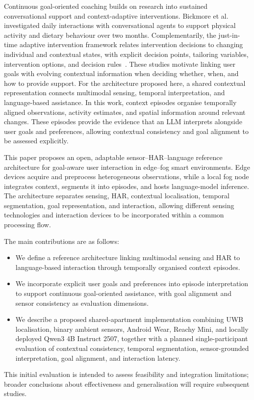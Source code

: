 \documentclass[10pt,twocolumn]{article}
\begin{document}
Continuous goal-oriented coaching builds on research into sustained conversational support and context-adaptive interventions. Bickmore et al.~\cite{bickmore2013interventions} investigated daily interactions with conversational agents to support physical activity and dietary behaviour over two months. Complementarily, the just-in-time adaptive intervention framework relates intervention decisions to changing individual and contextual states, with explicit decision points, tailoring variables, intervention options, and decision rules~\cite{nahumshani2018jitai}. These studies motivate linking user goals with evolving contextual information when deciding whether, when, and how to provide support. For the architecture proposed here, a shared contextual representation connects multimodal sensing, temporal interpretation, and language-based assistance. In this work, context episodes organise temporally aligned observations, activity estimates, and spatial information around relevant changes. These episodes provide the evidence that an LLM interprets alongside user goals and preferences, allowing contextual consistency and goal alignment to be assessed explicitly.

This paper proposes an open, adaptable sensor--HAR--language reference architecture for goal-aware user interaction in edge--fog smart environments. Edge devices acquire and preprocess heterogeneous observations, while a local fog node integrates context, segments it into episodes, and hosts language-model inference. The architecture separates sensing, HAR, contextual localisation, temporal segmentation, goal representation, and interaction, allowing different sensing technologies and interaction devices to be incorporated within a common processing flow.

The main contributions are as follows:
\begin{itemize}
    \item We define a reference architecture linking multimodal sensing and HAR to language-based interaction through temporally organised context episodes.
    \item We incorporate explicit user goals and preferences into episode interpretation to support continuous goal-oriented assistance, with goal alignment and sensor consistency as evaluation dimensions.
    \item We describe a proposed shared-apartment implementation combining UWB localisation, binary ambient sensors, Android Wear, Reachy Mini, and locally deployed Qwen3 4B Instruct 2507, together with a planned single-participant evaluation of contextual consistency, temporal segmentation, sensor-grounded interpretation, goal alignment, and interaction latency.
\end{itemize}
This initial evaluation is intended to assess feasibility and integration limitations; broader conclusions about effectiveness and generalisation will require subsequent studies.
\end{document}
